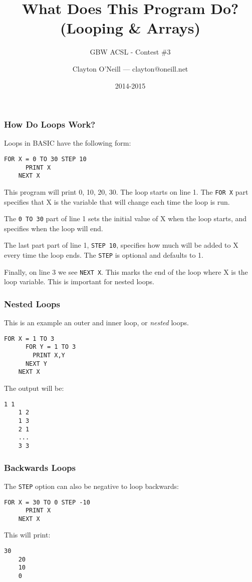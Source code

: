 \documentclass[handout,fleqn, t]{beamer}
\title{What Does This Program Do?\linebreak (Looping \& Arrays)}
\subtitle{GBW ACSL - Contest \#3}
\author{Clayton O'Neill --- clayton@oneill.net}
\date{2014-2015}
\begin{document}
\frame{\titlepage}

\begin{frame}[fragile]
  \frametitle{How Do Loops Work?}
  Loops in BASIC have the following form:

  \begin{lstlisting}[gobble=4]
    FOR X = 0 TO 30 STEP 10
      PRINT X
    NEXT X
  \end{lstlisting}

  This program will print 0, 10, 20, 30.  The loop starts on line 1.  The
  \lstinline{FOR X} part specifies that X is the variable that will change
  each time the loop is run.

  The \lstinline{0 TO 30} part of line 1 sets the initial value of X when the
  loop starts, and specifies when the loop will end.

  The last part part of line 1, \lstinline{STEP 10}, specifies how much will be
  added to X every time the loop ends.  The \lstinline{STEP} is optional and
  defaults to 1.

  Finally, on line 3 we see \lstinline{NEXT X}.  This marks the end of the loop
  where X is the loop variable.  This is important for nested loops.

\end{frame}

\begin{frame}[fragile]
  \frametitle{Nested Loops}

  This is an example an outer and inner loop, or \textit{nested} loops.

  \begin{lstlisting}[gobble=4]
    FOR X = 1 TO 3
      FOR Y = 1 TO 3
        PRINT X,Y
      NEXT Y
    NEXT X
  \end{lstlisting}

  The output will be:
    \begin{lstlisting}[gobble=4]
    1 1
    1 2
    1 3
    2 1
    ...
    3 3
    \end{lstlisting}

\end{frame}

\begin{frame}[fragile]
  \frametitle{Backwards Loops}

  The \lstinline{STEP} option can also be negative to loop backwards:

  \begin{lstlisting}[gobble=4]
    FOR X = 30 TO 0 STEP -10
      PRINT X
    NEXT X
  \end{lstlisting}

  This will print:
  \begin{lstlisting}[gobble=4]
    30
    20
    10
    0
  \end{lstlisting}
\end{frame}
\end{document}
